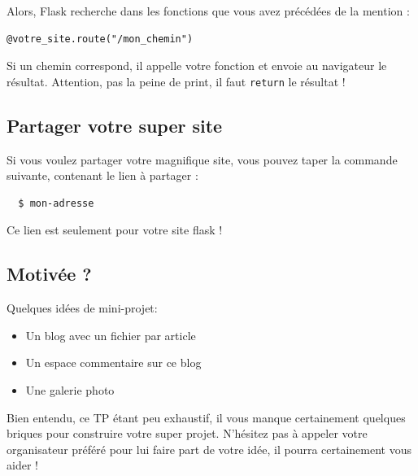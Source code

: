 Alors, Flask recherche dans les fonctions que vous avez précédées de la mention :
\begin{center}
  \begin{verbatim}
@votre_site.route("/mon_chemin")
  \end{verbatim}
\end{center}

Si un chemin correspond, il appelle votre fonction et envoie au navigateur le
résultat. Attention, pas la peine de print, il faut \texttt{return}
le résultat !

\subsection{Partager votre super site}
Si vous voulez partager votre magnifique site, vous pouvez taper la commande
suivante, contenant le lien à partager :
\begin{verbatim}
  $ mon-adresse
\end{verbatim}
Ce lien est seulement pour votre site flask !


\subsection{Motivée ?}

Quelques idées de mini-projet:
\begin{itemize}
\item Un blog avec un fichier par article
\item Un espace commentaire sur ce blog
\item Une galerie photo
\end{itemize}

Bien entendu, ce TP étant peu exhaustif, il vous manque certainement quelques
briques pour construire votre super projet. N'hésitez pas à appeler votre
organisateur préféré pour lui faire part de votre idée, il pourra certainement
vous aider !
